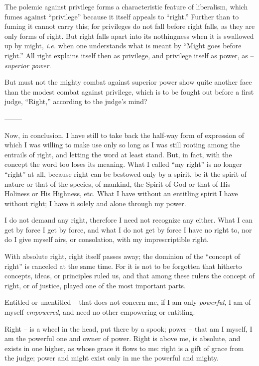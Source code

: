 \documentclass[12pt,a4paper]{book}
\begin{document}
The polemic against privilege forms a characteristic feature of liberalism, 
which fumes against ``privilege'' because it itself appeals to ``right.'' 
Further than to fuming it cannot carry this; for privileges do not fall before 
right falls, as they are only forms of right. But right falls apart into its 
nothingness when it is swallowed up by might, \textit{i.e.} when one 
understands what is meant by ``Might goes before right.'' All right explains 
itself then as privilege, and privilege itself as power, as -- 
\textit{superior power}.

But must not the mighty combat against superior power show quite another face 
than the modest combat against privilege, which is to be fought out before a 
first judge, ``Right,'' according to the judge's mind?

\begin{center}
--------\end{center}


Now, in conclusion, I have still to take back the half-way form of expression 
of which I was willing to make use only so long as I was still rooting among 
the entrails of right, and letting the word at least stand. But, in fact, with 
the concept the word too loses its meaning. What I called ``my right'' is no 
longer ``right'' at all, because right can be bestowed only by a spirit, be 
it the spirit of nature or that of the species, of mankind, the Spirit of God 
or that of His Holiness or His Highness, etc. What I have without an entitling 
spirit I have without right; I have it solely and alone through my power.

I do not demand any right, therefore I need not recognize any either. What I 
can get by force I get by force, and what I do not get by force I have no 
right to, nor do I give myself airs, or consolation, with my imprescriptible 
right.

With absolute right, right itself passes away; the dominion of the ``concept 
of right'' is canceled at the same time. For it is not to be forgotten that 
hitherto concepts, ideas, or principles ruled us, and that among these rulers 
the concept of right, or of justice, played one of the most important parts.

Entitled or unentitled -- that does not concern me, if I am only 
\textit{powerful}, I am of myself \textit{empowered}, and need no other 
empowering or entitling.

Right -- is a wheel in the head, put there by a spook; power -- that am I 
myself, I am the powerful one and owner of power. Right is above me, is 
absolute, and exists in one higher, as whose grace it flows to me: right is a 
gift of grace from the judge; power and might exist only in me the powerful 
and mighty.
\end{document}

